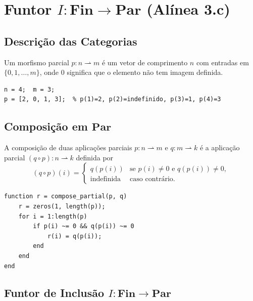 \section{Funtor $I: \mathbf{Fin} \to \mathbf{Par}$ (Alínea 3.c)}
\label{sec:functor-fin-par}

\subsection{Descrição das Categorias}

\begin{definition}
Um morfismo parcial $p: n \rightharpoonup m$ é um vetor de comprimento $n$ com entradas em $\{0, 1,\ldots,m\}$, onde $0$ significa que o elemento não tem imagem definida.
\end{definition}

\begin{lstlisting}[style=matlab, caption={Morfismo parcial em $\mathbf{Par}$}]
n = 4;  m = 3;
p = [2, 0, 1, 3];  % p(1)=2, p(2)=indefinido, p(3)=1, p(4)=3
\end{lstlisting}

\subsection{Composição em $\mathbf{Par}$}

A composição de duas aplicações parciais $p: n \rightharpoonup m$ e $q: m \rightharpoonup k$ é a aplicação parcial $(q \circ p): n \rightharpoonup k$ definida por
\[
    (q \circ p)(i) =
    \begin{cases}
        q(p(i)) & \text{se } p(i) \neq 0 \text{ e } q(p(i)) \neq 0,\\
        \text{indefinida} & \text{caso contrário.}
    \end{cases}
\]

\begin{lstlisting}[style=matlab, caption={Composição de aplicações parciais}]
function r = compose_partial(p, q)
    r = zeros(1, length(p));
    for i = 1:length(p)
        if p(i) ~= 0 && q(p(i)) ~= 0
            r(i) = q(p(i));
        end
    end
end
\end{lstlisting}

\subsection{Funtor de Inclusão $I: \mathbf{Fin} \to \mathbf{Par}$}

